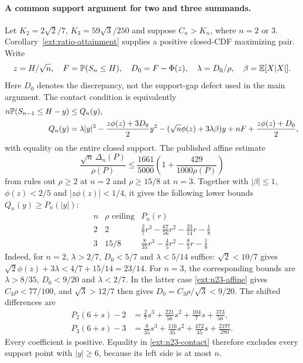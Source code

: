 \paragraph{A common support argument for two and three summands.}
Let $K_2=2\sqrt2/7$, $K_3=59\sqrt3/250$ and suppose $C_n>K_n$,
where $n=2$ or $3$.  Corollary~\ref{ext:ratio-attainment} supplies a
positive closed-CDF maximizing pair.  Write
\[
 z=H/\sqrt n,\quad F=\mathbb P(S_n\le H),\quad D_0=F-\Phi(z),
 \quad \lambda=D_0/\rho,\quad \beta=\mathbb E[X|X|].
\]
Here $D_0$ denotes the discrepancy, not the support-gap defect used in
the main argument.  The contact condition is equivalently
\begin{align}
 n\mathbb P(S_{n-1}\le H-y)&\le Q_n(y),\notag\\
 Q_n(y)&=\lambda|y|^3-\frac{z\phi(z)+3D_0}{2}y^2
 -(\sqrt n\phi(z)+3\lambda\beta)y
 +nF+\frac{z\phi(z)+D_0}{2},\label{ext:n23-contact}
\end{align}
with equality on the entire closed support.
The published affine estimate
\begin{equation}\label{ext:n23-affine}
 \frac{\sqrt n\,\Delta_n(P)}{\rho(P)}\le\frac{1661}{5000}
       \left(1+\frac{429}{1000\rho(P)}\right)
\end{equation}
from \citet{Shevtsova2013} rules out $\rho\ge2$ at $n=2$ and
$\rho\ge15/8$ at $n=3$.  Together with $|\beta|\le1$,
$\phi(z)<2/5$ and $|z\phi(z)|<1/4$, it gives the following lower
bounds $Q_n(y)\ge P_n(|y|)$:
\[
\begin{array}{c|c|c}
 n&\rho\text{ ceiling}&P_n(r)\\\hline
 2&2&\displaystyle\frac27r^3-\frac{67}{56}r^2-\frac{23}{14}r-\frac18\\[2pt]
 3&15/8&\displaystyle\frac8{35}r^3-\frac45r^2-\frac85r-\frac18
\end{array}
\]
Indeed, for $n=2$, $\lambda>2/7$, $D_0<5/7$ and
$\lambda<5/14$ suffice: $\sqrt2<10/7$ gives
$\sqrt2\phi(z)+3\lambda<4/7+15/14=23/14$.
For $n=3$, the corresponding bounds are
$\lambda>8/35$, $D_0<9/20$ and $\lambda<2/7$.
In the latter case \eqref{ext:n23-affine} gives $C_3\rho<77/100$,
and $\sqrt3>12/7$ then gives $D_0=C_3\rho/\sqrt3<9/20$.
The shifted differences are
\begin{align*}
 P_2(6+s)-2&=\frac27s^3+\frac{221}{56}s^2+
                  \frac{104}{7}s+\frac{373}{56},\\
 P_3(6+s)-3&=\frac8{35}s^3+\frac{116}{35}s^2+
                  \frac{472}{35}s+\frac{2197}{280}.
\end{align*}
Every coefficient is positive.  Equality in
\eqref{ext:n23-contact} therefore excludes every support point with
$|y|\ge6$, because its left side is at most $n$.

